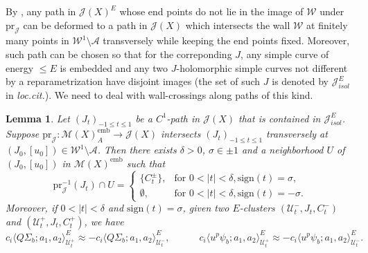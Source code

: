 \documentclass[reqno]{amsart}
\numberwithin{equation}{section}
\numberwithin{equation}{section}
\numberwithin{equation}{section}
\newtheorem{lemma}[thm]{Lemma}
\theoremstyle{definition}
\theoremstyle{remark}
\theoremstyle{remark}
\begin{document}
By \cite[Lemma 6.5]{IP-GV}, any path in $\mathcal{J}(X)^E$ whose end points do not lie in the image of $\mathcal{W}$ under $\mathrm{pr}_{\mathcal{J}}$ can be deformed to a path in $\mathcal{J}(X)$ which intersects the wall $\mathcal{W}$ at finitely many points in $\mathcal{W}^1 \setminus \mathcal{A}$ transversely while keeping the end points fixed. Moreover, such path can be chosen so that for the correponding $J$, any simple curve of energy $\leq E$ is embedded and any two $J$-holomorphic simple curves not different by a reparametrization have disjoint images (the set of such $J$ is denoted by $\mathcal{J}^E_{isol}$ in \emph{loc.cit.}). We need to deal with wall-crossings along paths of this kind.

\begin{lemma}\label{lem:tech-2}
    Let $(J_t)_{-1 \leq t \leq 1}$ be a $C^1$-path in $\mathcal{J}(X)$ that is contained in $\mathcal{J}^E_{isol}$. Suppose $\mathrm{pr}_{\mathcal{J}}: \mathcal{M}(X)^{\mathrm{emb}}_A \to \mathcal{J}(X)$ intersects $(J_t)_{-1 \leq t \leq 1}$ transversely at $(J_0, [u_0]) \in \mathcal{W}^1 \setminus \mathcal{A}$. Then there exists $\delta > 0$, $\sigma \in {\pm 1}$ and a neighborhood $U$ of $(J_0, [u_0])$ in $\mathcal{M}(X)^{\mathrm{emb}}$ such that
    \begin{equation}
    \mathrm{pr}_{\mathcal{J}}^{-1}(J_t) \cap U = 
    \begin{cases}
    \{ C_t^{\pm}\}, &\text{for } 0 < |t| < \delta, \mathrm{sign}(t) = \sigma,\\
    \emptyset, &\text{for } 0 < |t| < \delta, \mathrm{sign}(t) = -\sigma.
    \end{cases}
    \end{equation}
    Moreover, if $0 < |t| < \delta$ and $\mathrm{sign}(t)=\sigma$, given two $E$-clusters $(\mathcal{U}_t^-, J_t, C_t^-)$ and $(\mathcal{U}_t^+, J_t, C_t^+)$, we have
    \begin{equation}
        c_i \langle Q\Sigma_b ; a_1, a_2 \rangle^E_{\mathcal{U}_t^+} \approx - c_i \langle Q\Sigma_b ; a_1, a_2 \rangle^E_{\mathcal{U}_t^-}, \quad \quad \quad c_i \langle  u^p \psi_b; a_1, a_2 \rangle^E_{\mathcal{U}_t^+}  \approx - c_i \langle u^p  \psi_b; a_1, a_2 \rangle^E_{\mathcal{U}_t^-}.
    \end{equation}
\end{lemma}
\end{document}
